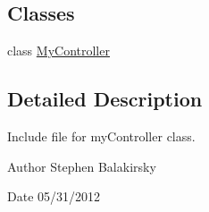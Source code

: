 \subsection*{Classes}
\begin{DoxyCompactItemize}
\item 
class \hyperlink{class_my_controller}{MyController}
\end{DoxyCompactItemize}


\subsection{Detailed Description}
Include file for myController class. \begin{DoxyAuthor}{Author}
Stephen Balakirsky 
\end{DoxyAuthor}
\begin{DoxyDate}{Date}
05/31/2012 
\end{DoxyDate}
